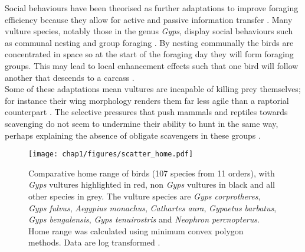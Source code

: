 Social behaviours have been theorised as further adaptations to improve foraging efficiency because they allow for active and passive information transfer \citep{jackson2011evolutionary,wakefield2013space,moleon2014inter}. Many vulture species, notably those in the genus \textit{Gyps}, display social behaviours such as communal nesting and group foraging \citep{mundy1992vultures}.  By nesting communally the birds are concentrated in space so at the start of the foraging day they will form foraging groups. This may lead to local enhancement effects such that one bird will follow another that descends to a carcass \citep{jackson2011evolutionary}.  \\ \indent Some of these adaptations mean vultures are incapable of killing prey themselves; for instance their wing morphology renders them far less agile than a raptorial counterpart \citep{ruxton2004obligate}. The selective pressures that push mammals and reptiles towards scavenging do not seem to undermine their ability to hunt in the same way, perhaps explaining the absence of obligate scavengers in these groups \citep{ruxton2004obligate}. 

\begin{figure}[H] %
	  \centering
	  \texttt{[image: chap1/figures/scatter\_home.pdf]}
	    \caption[Comparative home range of birds] %
	    {Comparative home range of birds (107 species from 11 orders), with \textit{Gyps} vultures highlighted in red, non \textit{Gyps} vultures in black and all other species in grey. The vulture species are \textit{Gyps corprotheres}, \textit{Gyps fulvus}, \textit{Aegypius monachus}, \textit{Cathartes aura}, \textit{Gypaetus barbatus}, \textit{Gyps bengalensis}, \textit{Gyps tenuirostris} and \textit{Neophron percnopterus}. Home range was calculated using minimum convex polygon methods. Data are log transformed \citep{peery2000factors,garcia2011ranging,gilbert2007vulture,kruger2014trends,vasilakis2005breeding,dwyer2010ecology,donazar1996communal,stroem2001home,buenestado2008habitat,gilbert2005behaviour,nesbitt1990home,pejchar2005hawaiian,springborn2005home,elchuk2003home,rhim2006home,legagneux2009variation,rolando1998factors,hoffman1991spring,dreitz2005movements,hansbauer2008comparative,garza2005home,vega2003home,stober2006variation,novoa2006home,holbrook2011home,fearer1999relationship,brandt2008breeding,giesen1992winter}.}%
	  \label{fig:scatter_home}
	\end{figure}

